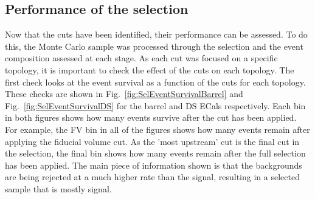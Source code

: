 \subsection{Performance of the selection}
\label{subsec:SelectionPerformance}
Now that the cuts have been identified, their performance can be assessed.  To do this, the Monte Carlo sample was processed through the selection and the event composition assessed at each stage.  As each cut was focused on a specific topology, it is important to check the effect of the cuts on each topology.  The first check looks at the event survival as a function of the cuts for each topology.  These checks are shown in Fig.~\ref{fig:SelEventSurvivalBarrel} and Fig.~\ref{fig:SelEventSurvivalDS} for the barrel and DS ECals respectively.  Each bin in both figures shows how many events survive after the cut has been applied.  For example, the FV bin in all of the figures shows how many events remain after applying the fiducial volume cut.  As the 'most upstream' cut is the final cut in the selection, the final bin shows how many events remain after the full selection has been applied.  The main piece of information shown is that the backgrounds are being rejected at a much higher rate than the signal, resulting in a selected sample that is mostly signal.

